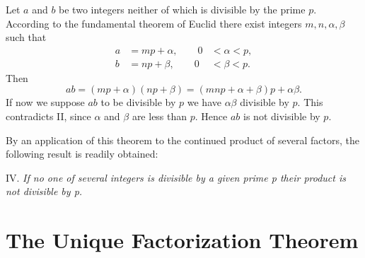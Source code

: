 \documentclass[oneside,12pt]{book}
\begin{document}
Let $a$ and $b$ be two integers neither of which is divisible by the prime $p$. According to the fundamental theorem of Euclid there exist integers $m, n, \alpha, \beta$ such that 
\begin{align*}
    a&=mp+\alpha, \qquad 0&<\alpha<p, \\
    b&=np+\beta, \qquad  0&<\beta<p. 
\end{align*}
Then 
$$ab=(mp+\alpha)(np+\beta)=(mnp+\alpha+\beta)p+\alpha\beta.$$
If now we suppose $ab$ to be divisible by $p$ we have $\alpha\beta$ divisible by $p$. This contradicts II, since $\alpha$ and $\beta$ are less than $p$. Hence $ab$ is not divisible by $p$. \par 

By an application of this theorem to the continued product of several factors, the following result is readily obtained: \par 

IV. \textit{If no one of several integers is divisible by a given prime p their product is not divisible by p.}

\section{The Unique Factorization Theorem}
\end{document}
